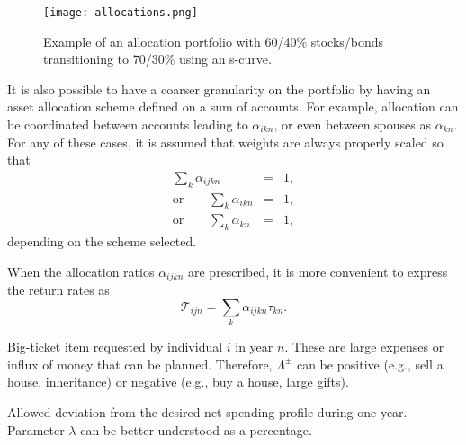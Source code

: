 \documentclass{report}[fleqn,12pt]
\begin{document}
\begin{description}[leftmargin=4em,style=multiline]
	\begin{figure}[t]
	\texttt{[image: allocations.png]}
		\caption{\small Example of an allocation portfolio with 60/40\% stocks/bonds 
		transitioning to 70/30\% using an s-curve. \label{Fig:allocations}}
	\end{figure}
	It is also possible to have a coarser granularity on the portfolio by
	having an asset allocation scheme
	defined on a sum of accounts. For example, allocation can be coordinated between accounts
	leading to $\alpha_{ikn}$, or even between spouses as $\alpha_{kn}$.
	For any of these cases, it is assumed that weights are always properly scaled so that
	\begin{eqnarray}
		\sum_{k} \alpha_{ijkn} &=& 1, \nonumber\\
		\text{or} \qquad \sum_{k} \alpha_{ikn} &=& 1, \nonumber\\
		\text{or} \qquad \sum_{k} \alpha_{kn} &=& 1,
	\end{eqnarray}
	depending on the scheme selected.

\item[$\mathcal{T}_{ijn}$]
	When the allocation ratios $\alpha_{ijkn}$ are prescribed,
	it is more convenient to express the return rates as
	\begin{equation}
		\mathcal{T}_{ijn} = \sum_k \alpha_{ijkn} \tau_{kn}.
	\end{equation}

\item [$\Lambda^\pm_{in}$]
	Big-ticket item requested by individual $i$ in year $n$.
	These are large expenses or influx of money
	that can be planned. Therefore, $\Lambda^\pm$ can be positive
	(e.g., sell a house, inheritance) or negative (e.g., buy a house, large gifts).
\item [$\lambda$]
        Allowed deviation from the desired net spending profile during one year. Parameter
        $\lambda$ can be better understood as a percentage.


\end{description}
\end{document}
